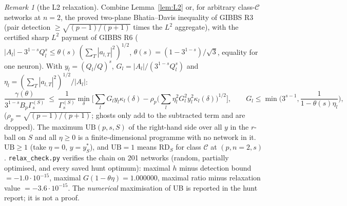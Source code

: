 \documentclass[11pt]{article}
\theoremstyle{remark}
\newtheorem{remark}[theorem]{Remark}
\begin{document}
\begin{remark}[the L2 relaxation]
Combine Lemma~\ref{lem:L2} or, for arbitrary class-$\mathcal C$ networks at $n=2$, the proved two-plane Bhatia--Davis inequality of GIBBS R3
(pair detection $\ge\sqrt{(p-1)/(p+1)}$ times the $L^2$ aggregate), with the certified sharp $L^2$ payment of GIBBS R6
($|A_l|-3^{1-s}Q_l^s\le\theta(s)\,(\sum_T|a_{l,T}|^2)^{1/2}$, $\theta(s)=(1-3^{1-s})/\sqrt3$, equality for one neuron).  With
$y_l=(Q_l/Q)^s$, $G_l=|A_l|/(3^{1-s}Q_l^s)$ and $\eta_l=(\sum_T|a_{l,T}|^2)^{1/2}/|A_l|$:
\[
\frac{\gamma(\theta)}{3^{1-s}B_p\Gamma^{(S)}_s}\ \le\ \frac1{\Gamma^{(S)}_s}\min_\delta\Big[\sum_lG_ly_l\kappa_l(\delta)-\rho_p\Big(\sum_l\eta_l^2G_l^2y_l^2\kappa_l(\delta)\Big)^{1/2}\Big],
\qquad G_l\le\min\Big(3^{s-1},\frac1{1-\theta(s)\eta_l}\Big),
\]
($\rho_p=\sqrt{(p-1)/(p+1)}$; ghosts only add to the subtracted term and are dropped).  The maximum $\mathrm{UB}(p,s,S)$ of the right-hand
side over all $y$ in the $r$-ball on $S$ and all $\eta\ge0$ is a finite-dimensional programme with no network in it.  $\mathrm{UB}\ge1$ (take $\eta=0$,
$y=y^\ast_S$), and $\mathrm{UB}=1$ means RD$_S$ for class $\mathcal C$ at $(p,n{=}2,s)$.  \texttt{relax\_check.py} verifies the chain on 201 networks
(random, partially optimised, and every saved hunt optimum): maximal $h$ minus detection bound $=-1.0\cdot10^{-15}$, maximal $G(1-\theta\eta)=1.000000$,
maximal ratio minus relaxation value $=-3.6\cdot10^{-15}$.  The \emph{numerical} maximisation of UB is reported in the hunt report; it is not a proof.
\end{remark}
\end{document}
